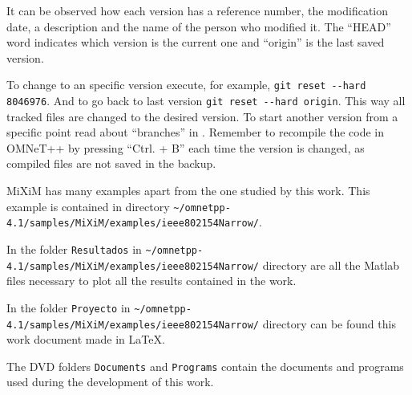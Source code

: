It can be observed how each version has a reference number, the modification date, a description and the name of the person who modified
it. The ``HEAD'' word indicates which version is the current one and ``origin'' is the last saved version.

To change to an specific version execute, for example, \verb|git reset --hard 8046976|. And to go back to last version \verb|git reset --hard origin|.
This way all tracked files are changed to the desired version. To start another version from a specific point read about ``branches'' in
\cite{manualgit}. Remember to recompile the code in \ac{OMNeT++} by pressing ``Ctrl. + B'' each time the version is changed, as compiled
files are not saved in the backup.

MiXiM has many examples apart from the one studied by this work. This example is contained in directory \verb|~/omnetpp-4.1/samples/MiXiM/examples/ieee802154Narrow/|.

In the folder \verb|Resultados| in \verb|~/omnetpp-4.1/samples/MiXiM/examples/ieee802154Narrow/| directory are all the Matlab files necessary to plot
all the results contained in the work.

In the folder \verb|Proyecto| in \verb|~/omnetpp-4.1/samples/MiXiM/examples/ieee802154Narrow/| directory can be found this work document made in \LaTeX{}.

The \ac{DVD} folders \verb|Documents| and \verb|Programs| contain the documents and programs used during the development of this work.
